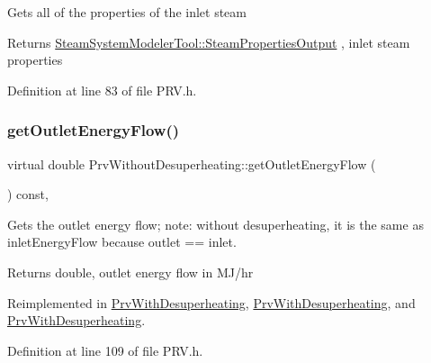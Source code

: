 Gets all of the properties of the inlet steam \begin{DoxyReturn}{Returns}
\hyperlink{struct_steam_system_modeler_tool_1_1_steam_properties_output}{Steam\+System\+Modeler\+Tool\+::\+Steam\+Properties\+Output} , inlet steam properties 
\end{DoxyReturn}


Definition at line 83 of file P\+R\+V.\+h.

\mbox{\label{class_prv_without_desuperheating_a6529a68ffa444ae87c890b2bcbc2cc84}} 
\subsubsection{\texorpdfstring{get\+Outlet\+Energy\+Flow()}{getOutletEnergyFlow()}\hspace{0.1cm}{\footnotesize\ttfamily [1/3]}}
{\footnotesize\ttfamily virtual double Prv\+Without\+Desuperheating\+::get\+Outlet\+Energy\+Flow (\begin{DoxyParamCaption}{ }\end{DoxyParamCaption}) const\hspace{0.3cm}{\ttfamily [inline]}, {\ttfamily [virtual]}}

Gets the outlet energy flow; note\+: without desuperheating, it is the same as inlet\+Energy\+Flow because outlet == inlet. \begin{DoxyReturn}{Returns}
double, outlet energy flow in M\+J/hr 
\end{DoxyReturn}


Reimplemented in \hyperlink{class_prv_with_desuperheating_a2394fb62e4fc85252fc4eb15f08e9f1e}{Prv\+With\+Desuperheating}, \hyperlink{class_prv_with_desuperheating_a2394fb62e4fc85252fc4eb15f08e9f1e}{Prv\+With\+Desuperheating}, and \hyperlink{class_prv_with_desuperheating_a2394fb62e4fc85252fc4eb15f08e9f1e}{Prv\+With\+Desuperheating}.



Definition at line 109 of file P\+R\+V.\+h.

\mbox{\label{class_prv_without_desuperheating_a6529a68ffa444ae87c890b2bcbc2cc84}} 
